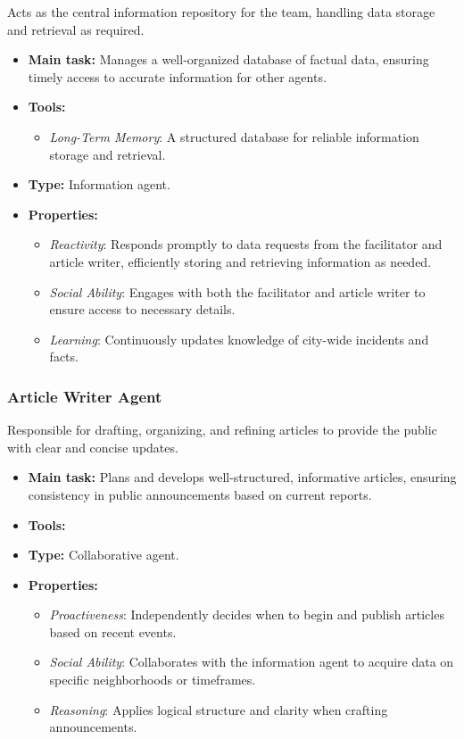 Acts as the central information repository for the team, handling data storage and retrieval as required.

\begin{itemize}
    \item \textbf{Main task:} Manages a well-organized database of factual data, ensuring timely access to accurate information for other agents.
    \item \textbf{Tools:}
    \begin{itemize}
        \item \emph{Long-Term Memory}: A structured database for reliable information storage and retrieval.
    \end{itemize}
    \item \textbf{Type:} Information agent.
    \item \textbf{Properties:}
    \begin{itemize}
        \item \emph{Reactivity}: Responds promptly to data requests from the facilitator and article writer, efficiently storing and retrieving information as needed.
        \item \emph{Social Ability}: Engages with both the facilitator and article writer to ensure access to necessary details.
        \item \emph{Learning}: Continuously updates knowledge of city-wide incidents and facts.
    \end{itemize}
\end{itemize}

\subsubsection{Article Writer Agent}

Responsible for drafting, organizing, and refining articles to provide the public with clear and concise updates.

\begin{itemize}
    \item \textbf{Main task:} Plans and develops well-structured, informative articles, ensuring consistency in public announcements based on current reports.
    \item \textbf{Tools:} 
    \item \textbf{Type:} Collaborative agent.
    \item \textbf{Properties:}
    \begin{itemize}
        \item \emph{Proactiveness}: Independently decides when to begin and publish articles based on recent events.
        \item \emph{Social Ability}: Collaborates with the information agent to acquire data on specific neighborhoods or timeframes.
        \item \emph{Reasoning}: Applies logical structure and clarity when crafting announcements.
    \end{itemize}
\end{itemize}

